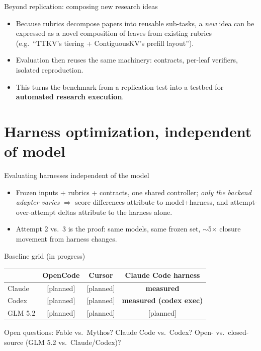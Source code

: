 \documentclass[aspectratio=169]{beamer}
\begin{document}
\begin{frame}{Beyond replication: composing new research ideas}
  \begin{itemize}
    \item Because rubrics decompose papers into reusable sub-tasks, a \emph{new} idea
          can be expressed as a novel composition of leaves from existing rubrics
          (e.g.\ ``TTKV's tiering + ContiguousKV's prefill layout'').
    \item Evaluation then reuses the same machinery: contracts, per-leaf verifiers,
          isolated reproduction.
    \item This turns the benchmark from a replication test into a testbed for
          \textbf{automated research execution}.
  \end{itemize}
\end{frame}

\section{Harness optimization, independent of model}

\begin{frame}{Evaluating harnesses independent of the model}
  \begin{itemize}
    \item Frozen inputs + rubrics + contracts, one shared controller; \emph{only the
          backend adapter varies} $\Rightarrow$ score differences attribute to
          model+harness, and attempt-over-attempt deltas attribute to the harness alone.
    \item Attempt 2 vs.\ 3 is the proof: same models, same frozen set,
          $\sim$5$\times$ closure movement from harness changes.
  \end{itemize}
  \vspace{0.5em}
  \begin{block}{Baseline grid (in progress)}
    \centering
    \small
    \begin{tabular}{lccc}
      \toprule
      & OpenCode & Cursor & Claude Code harness \\
      \midrule
      Claude   & [planned] & [planned] & \textbf{measured} \\
      Codex    & [planned] & [planned] & \textbf{measured (codex exec)} \\
      GLM 5.2  & [planned] & [planned] & [planned] \\
      \bottomrule
    \end{tabular}
  \end{block}
  \vspace{0.3em}
  \footnotesize Open questions: Fable vs.\ Mythos? Claude Code vs.\ Codex? Open- vs.\
  closed-source (GLM 5.2 vs.\ Claude/Codex)?
\end{frame}
\end{document}

